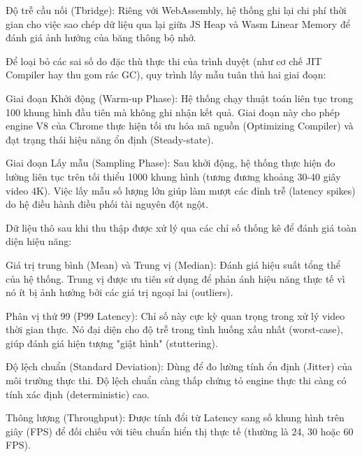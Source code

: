 Độ trễ cầu nối (Tbridge): Riêng với WebAssembly, hệ thống ghi lại chi phí thời gian cho việc sao chép dữ liệu qua lại giữa JS Heap và Wasm Linear Memory để đánh giá ảnh hưởng của băng thông bộ nhớ.



Để loại bỏ các sai số do đặc thù thực thi của trình duyệt (như cơ chế JIT Compiler hay thu gom rác GC), quy trình lấy mẫu tuân thủ hai giai đoạn:


Giai đoạn Khởi động (Warm-up Phase): Hệ thống chạy thuật toán liên tục trong 100 khung hình đầu tiên mà không ghi nhận kết quả. Giai đoạn này cho phép engine V8 của Chrome thực hiện tối ưu hóa mã nguồn (Optimizing Compiler) và đạt trạng thái hiệu năng ổn định (Steady-state).


Giai đoạn Lấy mẫu (Sampling Phase): Sau khởi động, hệ thống thực hiện đo lường liên tục trên tối thiểu 1000 khung hình (tương đương khoảng 30-40 giây video 4K). Việc lấy mẫu số lượng lớn giúp làm mượt các đỉnh trễ (latency spikes) do hệ điều hành điều phối tài nguyên đột ngột.



Dữ liệu thô sau khi thu thập được xử lý qua các chỉ số thống kê để đánh giá toàn diện hiệu năng:


Giá trị trung bình (Mean) và Trung vị (Median): Đánh giá hiệu suất tổng thể của hệ thống. Trung vị được ưu tiên sử dụng để phản ánh hiệu năng thực tế vì nó ít bị ảnh hưởng bởi các giá trị ngoại lai (outliers).


Phân vị thứ 99 (P99 Latency): Chỉ số này cực kỳ quan trọng trong xử lý video thời gian thực. Nó đại diện cho độ trễ trong tình huống xấu nhất (worst-case), giúp đánh giá hiện tượng "giật hình" (stuttering).


Độ lệch chuẩn (Standard Deviation): Dùng để đo lường tính ổn định (Jitter) của môi trường thực thi. Độ lệch chuẩn càng thấp chứng tỏ engine thực thi càng có tính xác định (deterministic) cao.


Thông lượng (Throughput): Được tính đổi từ Latency sang số khung hình trên giây (FPS) để đối chiếu với tiêu chuẩn hiển thị thực tế (thường là 24, 30 hoặc 60 FPS).
